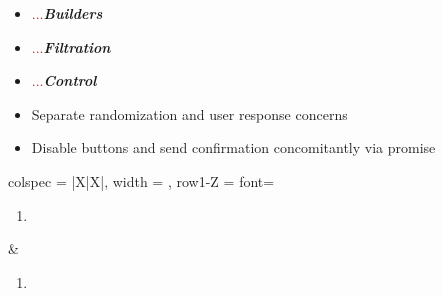 \documentclass[7px]{article}
\begin{document}
\deploy
{
  \begin{itemize}
    \item[] \textcolor{red}{...}\textbf{\textsl{Builders}}
    \item[] \textcolor{red}{...}\textbf{\textsl{Filtration}}
    \item[] \textcolor{red}{...}\textbf{\textsl{Control}}
    \item Separate randomization and user response concerns
    \item Disable buttons and send confirmation concomitantly via promise
  \end{itemize}
}
{
 \raggedright
  \begin{tblr}{
      colspec = {|X|X|}, width = \linewidth,
      row{1-Z} = {font=\scriptsize}
    }
    { 
      \begin{enumerate}
        \item 
      \end{enumerate}
    } & {
      \begin{enumerate}
        \item
      \end{enumerate}
    } \\
  \end{tblr}
}
\end{document}
